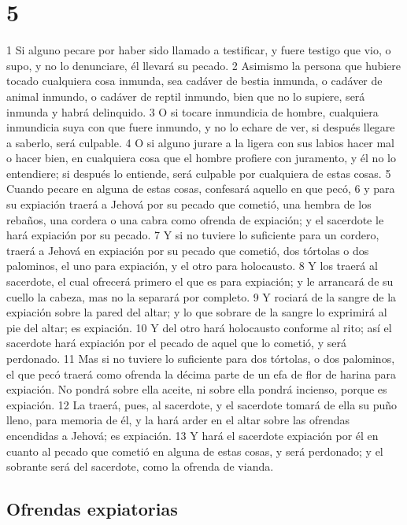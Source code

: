 \chapter{5}

1 Si alguno pecare por haber sido llamado a testificar, y fuere testigo que vio, o supo, y no lo denunciare, él llevará su pecado.
2 Asimismo la persona que hubiere tocado cualquiera cosa inmunda, sea cadáver de bestia inmunda, o cadáver de animal inmundo, o cadáver de reptil inmundo, bien que no lo supiere, será inmunda y habrá delinquido.
3 O si tocare inmundicia de hombre, cualquiera inmundicia suya con que fuere inmundo, y no lo echare de ver, si después llegare a saberlo, será culpable.
4 O si alguno jurare a la ligera con sus labios hacer mal o hacer bien, en cualquiera cosa que el hombre profiere con juramento, y él no lo entendiere; si después lo entiende, será culpable por cualquiera de estas cosas.
5 Cuando pecare en alguna de estas cosas, confesará aquello en que pecó,
6 y para su expiación traerá a Jehová por su pecado que cometió, una hembra de los rebaños, una cordera o una cabra como ofrenda de expiación; y el sacerdote le hará expiación por su pecado.
7 Y si no tuviere lo suficiente para un cordero, traerá a Jehová en expiación por su pecado que cometió, dos tórtolas o dos palominos, el uno para expiación, y el otro para holocausto.
8 Y los traerá al sacerdote, el cual ofrecerá primero el que es para expiación; y le arrancará de su cuello la cabeza, mas no la separará por completo.
9 Y rociará de la sangre de la expiación sobre la pared del altar; y lo que sobrare de la sangre lo exprimirá al pie del altar; es expiación.
10 Y del otro hará holocausto conforme al rito; así el sacerdote hará expiación por el pecado de aquel que lo cometió, y será perdonado.
11 Mas si no tuviere lo suficiente para dos tórtolas, o dos palominos, el que pecó traerá como ofrenda la décima parte de un efa   de flor de harina para expiación. No pondrá sobre ella aceite, ni sobre ella pondrá incienso, porque es expiación.
12 La traerá, pues, al sacerdote, y el sacerdote tomará de ella su puño lleno, para memoria de él, y la hará arder en el altar sobre las ofrendas encendidas a Jehová; es expiación.
13 Y hará el sacerdote expiación por él en cuanto al pecado que cometió en alguna de estas cosas, y será perdonado; y el sobrante será del sacerdote, como la ofrenda de vianda.  

\section{Ofrendas expiatorias}

